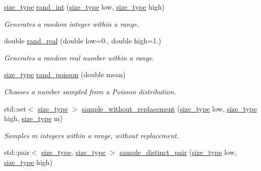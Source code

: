 \begin{DoxyCompactItemize}
\mbox{\hyperlink{constants_8h_abcd18a5521fc90ff6e7b00e4fee98397}{size\+\_\+type}} \mbox{\hyperlink{classrcombinator_1_1RandMaths_a8072bad64e64ef042e5257e1bee85635}{rand\+\_\+int}} (\mbox{\hyperlink{constants_8h_abcd18a5521fc90ff6e7b00e4fee98397}{size\+\_\+type}} low, \mbox{\hyperlink{constants_8h_abcd18a5521fc90ff6e7b00e4fee98397}{size\+\_\+type}} high)
\begin{DoxyCompactList}\small\item\em Generates a random integer within a range. \end{DoxyCompactList}\item 
double \mbox{\hyperlink{classrcombinator_1_1RandMaths_aa6441baa59bff50f588c0c54e3c54140}{rand\+\_\+real}} (double low=0., double high=1.)
\begin{DoxyCompactList}\small\item\em Generates a random real number within a range. \end{DoxyCompactList}\item 
\mbox{\hyperlink{constants_8h_abcd18a5521fc90ff6e7b00e4fee98397}{size\+\_\+type}} \mbox{\hyperlink{classrcombinator_1_1RandMaths_adef66efd4d58f6130982ff0ee0e25750}{rand\+\_\+poisson}} (double mean)
\begin{DoxyCompactList}\small\item\em Chooses a number sampled from a Poisson distribution. \end{DoxyCompactList}\item 
std\+::set$<$ \mbox{\hyperlink{constants_8h_abcd18a5521fc90ff6e7b00e4fee98397}{size\+\_\+type}} $>$ \mbox{\hyperlink{classrcombinator_1_1RandMaths_a6a7fe159f46afec51d997e4d07d2cfe6}{sample\+\_\+without\+\_\+replacement}} (\mbox{\hyperlink{constants_8h_abcd18a5521fc90ff6e7b00e4fee98397}{size\+\_\+type}} low, \mbox{\hyperlink{constants_8h_abcd18a5521fc90ff6e7b00e4fee98397}{size\+\_\+type}} high, \mbox{\hyperlink{constants_8h_abcd18a5521fc90ff6e7b00e4fee98397}{size\+\_\+type}} m)
\begin{DoxyCompactList}\small\item\em Samples {\itshape m} integers within a range, without replacement. \end{DoxyCompactList}\item 
std\+::pair$<$ \mbox{\hyperlink{constants_8h_abcd18a5521fc90ff6e7b00e4fee98397}{size\+\_\+type}}, \mbox{\hyperlink{constants_8h_abcd18a5521fc90ff6e7b00e4fee98397}{size\+\_\+type}} $>$ \mbox{\hyperlink{classrcombinator_1_1RandMaths_a2758ba7c9818bc664c4b751a697e1fe6}{sample\+\_\+distinct\+\_\+pair}} (\mbox{\hyperlink{constants_8h_abcd18a5521fc90ff6e7b00e4fee98397}{size\+\_\+type}} low, \mbox{\hyperlink{constants_8h_abcd18a5521fc90ff6e7b00e4fee98397}{size\+\_\+type}} high)

\end{DoxyCompactItemize}
